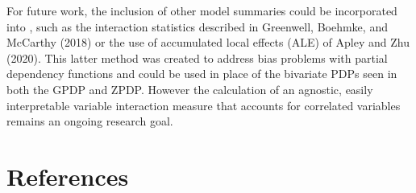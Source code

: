 For future work, the inclusion of other model summaries could be incorporated into , such as the interaction statistics described in Greenwell, Boehmke, and McCarthy (2018) or the use of accumulated local effects (ALE) of Apley and Zhu (2020). This latter method was created to address bias problems with partial dependency functions and could be used in place of the bivariate PDPs seen in both the GPDP and ZPDP. However the calculation of an agnostic, easily interpretable variable interaction measure that accounts for correlated variables remains an ongoing research goal.

\hypertarget{references}{%
\section*{References}\label{references}}

